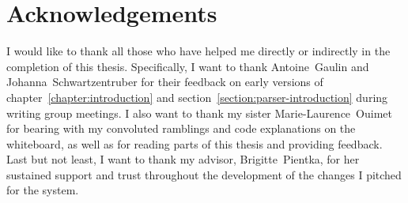 \chapter*{Acknowledgements}\label{chapter:acknowledgments}

I would like to thank all those who have helped me directly or indirectly in the completion of this thesis.
Specifically, I want to thank Antoine~Gaulin and Johanna~Schwartzentruber for their feedback on early versions of chapter~\ref{chapter:introduction} and section~\ref{section:parser-introduction} during writing group meetings.
I also want to thank my sister Marie-Laurence~Ouimet for bearing with my convoluted ramblings and code explanations on the whiteboard, as well as for reading parts of this thesis and providing feedback.
Last but not least, I want to thank my advisor, Brigitte~Pientka, for her sustained support and trust throughout the development of the changes I pitched for the \Beluga system.


